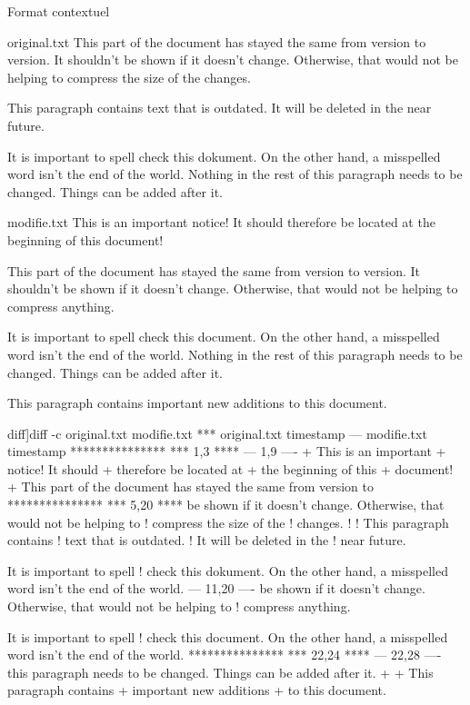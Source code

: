 \begin{frame}[fragile]{Format contextuel}
\begin{tcbraster}[raster columns=3, raster valign=top]
  \begin{snvlisting}{original.txt}
This part of the
document has stayed the
same from version to
version.  It shouldn't
be shown if it doesn't
change.  Otherwise, that
would not be helping to
compress the size of the
changes.

This paragraph contains
text that is outdated.
It will be deleted in the
near future.

It is important to spell
check this dokument. On
the other hand, a
misspelled word isn't
the end of the world.
Nothing in the rest of
this paragraph needs to
be changed. Things can
be added after it.
  \end{snvlisting}
  \begin{snvlisting}{modifie.txt}
This is an important
notice! It should
therefore be located at
the beginning of this
document!

This part of the
document has stayed the
same from version to
version.  It shouldn't
be shown if it doesn't
change.  Otherwise, that
would not be helping to
compress anything.

It is important to spell
check this document. On
the other hand, a
misspelled word isn't
the end of the world.
Nothing in the rest of
this paragraph needs to
be changed. Things can
be added after it.

This paragraph contains
important new additions
to this document.
\end{snvlisting}
\begin{snvlisting}[[context]diff]{diff -c original.txt modifie.txt}
*** original.txt	timestamp
--- modifie.txt	timestamp
***************
*** 1,3 ****
--- 1,9 ----
+ This is an important
+ notice! It should
+ therefore be located at
+ the beginning of this
+ document!
+
  This part of the
  document has stayed the
  same from version to
***************
*** 5,20 ****
  be shown if it doesn't
  change.  Otherwise, that
  would not be helping to
! compress the size of the
! changes.
!
! This paragraph contains
! text that is outdated.
! It will be deleted in the
! near future.

  It is important to spell
! check this dokument. On
  the other hand, a
  misspelled word isn't
  the end of the world.
--- 11,20 ----
  be shown if it doesn't
  change.  Otherwise, that
  would not be helping to
! compress anything.

  It is important to spell
! check this document. On
  the other hand, a
  misspelled word isn't
  the end of the world.
***************
*** 22,24 ****
--- 22,28 ----
  this paragraph needs to
  be changed. Things can
  be added after it.
+
+ This paragraph contains
+ important new additions
+ to this document.
\end{snvlisting}
\end{tcbraster}
\end{frame}

